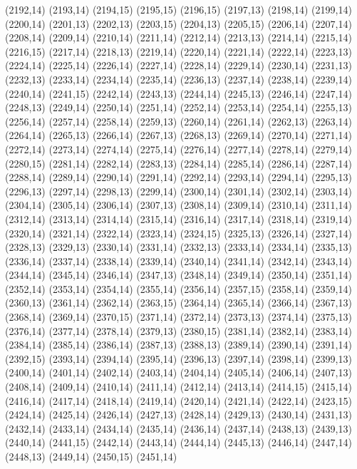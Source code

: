 (2192,14)
(2193,14)
(2194,15)
(2195,15)
(2196,15)
(2197,13)
(2198,14)
(2199,14)
(2200,14)
(2201,13)
(2202,13)
(2203,15)
(2204,13)
(2205,15)
(2206,14)
(2207,14)
(2208,14)
(2209,14)
(2210,14)
(2211,14)
(2212,14)
(2213,13)
(2214,14)
(2215,14)
(2216,15)
(2217,14)
(2218,13)
(2219,14)
(2220,14)
(2221,14)
(2222,14)
(2223,13)
(2224,14)
(2225,14)
(2226,14)
(2227,14)
(2228,14)
(2229,14)
(2230,14)
(2231,13)
(2232,13)
(2233,14)
(2234,14)
(2235,14)
(2236,13)
(2237,14)
(2238,14)
(2239,14)
(2240,14)
(2241,15)
(2242,14)
(2243,13)
(2244,14)
(2245,13)
(2246,14)
(2247,14)
(2248,13)
(2249,14)
(2250,14)
(2251,14)
(2252,14)
(2253,14)
(2254,14)
(2255,13)
(2256,14)
(2257,14)
(2258,14)
(2259,13)
(2260,14)
(2261,14)
(2262,13)
(2263,14)
(2264,14)
(2265,13)
(2266,14)
(2267,13)
(2268,13)
(2269,14)
(2270,14)
(2271,14)
(2272,14)
(2273,14)
(2274,14)
(2275,14)
(2276,14)
(2277,14)
(2278,14)
(2279,14)
(2280,15)
(2281,14)
(2282,14)
(2283,13)
(2284,14)
(2285,14)
(2286,14)
(2287,14)
(2288,14)
(2289,14)
(2290,14)
(2291,14)
(2292,14)
(2293,14)
(2294,14)
(2295,13)
(2296,13)
(2297,14)
(2298,13)
(2299,14)
(2300,14)
(2301,14)
(2302,14)
(2303,14)
(2304,14)
(2305,14)
(2306,14)
(2307,13)
(2308,14)
(2309,14)
(2310,14)
(2311,14)
(2312,14)
(2313,14)
(2314,14)
(2315,14)
(2316,14)
(2317,14)
(2318,14)
(2319,14)
(2320,14)
(2321,14)
(2322,14)
(2323,14)
(2324,15)
(2325,13)
(2326,14)
(2327,14)
(2328,13)
(2329,13)
(2330,14)
(2331,14)
(2332,13)
(2333,14)
(2334,14)
(2335,13)
(2336,14)
(2337,14)
(2338,14)
(2339,14)
(2340,14)
(2341,14)
(2342,14)
(2343,14)
(2344,14)
(2345,14)
(2346,14)
(2347,13)
(2348,14)
(2349,14)
(2350,14)
(2351,14)
(2352,14)
(2353,14)
(2354,14)
(2355,14)
(2356,14)
(2357,15)
(2358,14)
(2359,14)
(2360,13)
(2361,14)
(2362,14)
(2363,15)
(2364,14)
(2365,14)
(2366,14)
(2367,13)
(2368,14)
(2369,14)
(2370,15)
(2371,14)
(2372,14)
(2373,13)
(2374,14)
(2375,13)
(2376,14)
(2377,14)
(2378,14)
(2379,13)
(2380,15)
(2381,14)
(2382,14)
(2383,14)
(2384,14)
(2385,14)
(2386,14)
(2387,13)
(2388,13)
(2389,14)
(2390,14)
(2391,14)
(2392,15)
(2393,14)
(2394,14)
(2395,14)
(2396,13)
(2397,14)
(2398,14)
(2399,13)
(2400,14)
(2401,14)
(2402,14)
(2403,14)
(2404,14)
(2405,14)
(2406,14)
(2407,13)
(2408,14)
(2409,14)
(2410,14)
(2411,14)
(2412,14)
(2413,14)
(2414,15)
(2415,14)
(2416,14)
(2417,14)
(2418,14)
(2419,14)
(2420,14)
(2421,14)
(2422,14)
(2423,15)
(2424,14)
(2425,14)
(2426,14)
(2427,13)
(2428,14)
(2429,13)
(2430,14)
(2431,13)
(2432,14)
(2433,14)
(2434,14)
(2435,14)
(2436,14)
(2437,14)
(2438,13)
(2439,13)
(2440,14)
(2441,15)
(2442,14)
(2443,14)
(2444,14)
(2445,13)
(2446,14)
(2447,14)
(2448,13)
(2449,14)
(2450,15)
(2451,14)
